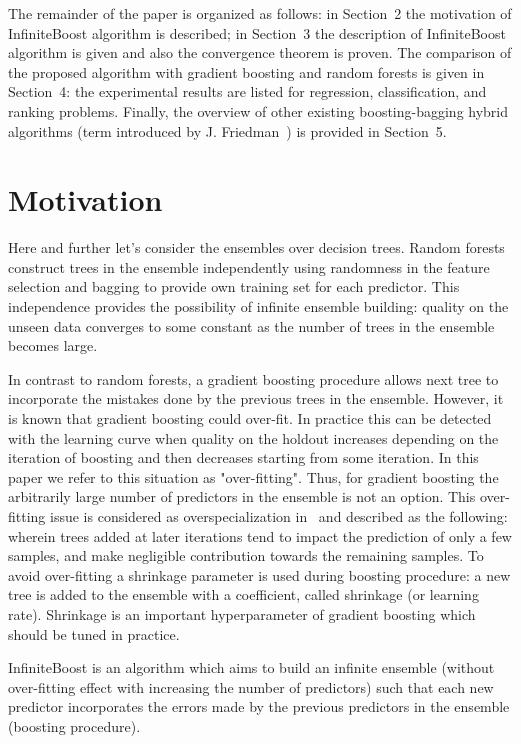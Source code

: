 The remainder of the paper is organized as follows: in Section~2 the motivation of InfiniteBoost algorithm is described; in Section~3 the description of InfiniteBoost algorithm is given and also the convergence theorem is proven.
The comparison of the proposed algorithm with gradient boosting and random forests is given in Section~4: the experimental results are listed for regression, classification, and ranking problems. 
Finally, the overview of other existing boosting-bagging hybrid algorithms (term introduced by J. Friedman~\cite{key-sgb}) is provided in Section~5.


\section{Motivation}
Here and further let's consider the ensembles over decision trees.
Random forests construct trees in the ensemble independently using randomness in the feature selection and bagging to provide own training set for each predictor. 
This independence provides the possibility of infinite ensemble building: quality on the unseen data converges to some constant as the number of trees in the ensemble becomes large.

In contrast to random forests, a gradient boosting procedure allows next tree to incorporate the mistakes done by the previous trees in the ensemble.
However, it is known that gradient boosting could over-fit.
In practice this can be detected with the learning curve when quality on the holdout increases depending on the iteration of boosting and then decreases starting from some iteration. 
In this paper we refer to this situation as "over-fitting".
Thus, for gradient boosting the arbitrarily large number of predictors in the ensemble is not an option. 
This over-fitting issue is considered as overspecialization in~\cite{key-dart} and described as the following: wherein trees added at later iterations tend to impact the prediction of only a few samples, and make negligible contribution towards the remaining samples.
To avoid over-fitting a shrinkage parameter is used during boosting procedure: a new tree is added to the ensemble with a coefficient, called shrinkage (or learning rate).
Shrinkage is an important hyperparameter of gradient boosting which should be tuned in practice.

InfiniteBoost is an algorithm which aims to build an infinite ensemble (without over-fitting effect with increasing the number of predictors) such that each new predictor incorporates the errors made by the previous predictors in the ensemble (boosting procedure).

